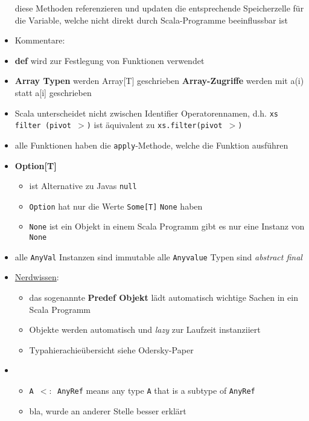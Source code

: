 \begin{itemize}
  diese Methoden referenzieren und updaten die entsprechende Speicherzelle für
  die Variable, welche nicht direkt durch Scala-Programme beeinflussbar ist
  \item Kommentare:

  \item \textbf{def} wird zur Festlegung von Funktionen verwendet
  \item \textbf{Array Typen} werden Array[T] geschrieben \und 
  \textbf{Array-Zugriffe} werden mit a(i) statt a[i] geschrieben
  \item Scala unterscheidet nicht zwischen Identifier \und Operatorennamen,
  d.h. \texttt{xs filter (pivot $>$)} ist äquivalent zu 
  \texttt{xs.filter(pivot $>$)}
  \item alle Funktionen haben die \texttt{apply}-Methode, welche die 
  Funktion ausführen
  \item \textbf{Option[T]}
  \begin{itemize}
    \item ist Alternative zu Javas \texttt{null}
    \item \texttt{Option} hat nur die Werte \texttt{Some[T]} \oder 
    \texttt{None} haben
    \item \texttt{None} ist ein Objekt \und in einem Scala Programm gibt es
    nur eine Instanz von \texttt{None}
  \end{itemize}
  \item alle \texttt{AnyVal} Instanzen sind immutable \und alle 
  \texttt{Anyvalue} Typen sind \textit{abstract final}
  \item \uline{Nerdwissen}:
  \begin{itemize}
    \item das sogenannte \textbf{Predef Objekt} lädt automatisch
    wichtige Sachen in ein Scala Programm
    \item Objekte werden automatisch und \textit{lazy} zur Laufzeit
    instanziiert
    \item Typahierachieübersicht siehe Odersky-Paper
  \end{itemize}
  
  \item {}

  \begin{itemize}
    \item \texttt{A $<:$ AnyRef} means any type \texttt{A} that is a 
    subtype of \texttt{AnyRef}
    \item bla, wurde an anderer Stelle besser erklärt
  \end{itemize}



\end{itemize}

